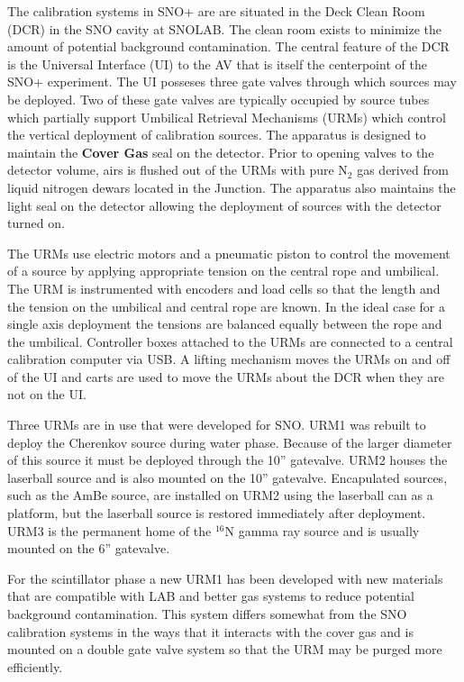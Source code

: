 The calibration systems in SNO+ are are situated in the Deck Clean
Room (DCR) in the SNO cavity at SNOLAB. The clean room exists to
minimize the amount of potential background contamination. The central
feature of the DCR is the Universal Interface (UI) to the AV that is
itself the centerpoint of the SNO+ experiment. The UI posseses three
gate valves through which sources may be deployed. Two of these gate
valves are typically occupied by source tubes which partially support
Umbilical Retrieval Mechanisms (URMs) which control the vertical
deployment of calibration sources. The apparatus is designed to
maintain the \textbf{Cover Gas} seal on the detector. Prior to opening
valves to the detector volume, airs is flushed out of the URMs with
pure N$_{2}$ gas derived from liquid nitrogen dewars located in the
Junction. The apparatus also maintains the light seal on the detector
allowing the deployment of sources with the detector turned on.

The URMs use electric motors and a pneumatic
piston to control the movement of a source by applying appropriate
tension on the central rope and umbilical. The URM is instrumented
with encoders and load cells so that the length and the tension on the
umbilical and central rope are known. In the ideal case for a single
axis deployment the tensions are balanced equally between the rope and
the umbilical. Controller boxes attached to the URMs are connected to
a central calibration computer via USB. A lifting mechanism moves the
URMs on and off of the UI and carts are used to move the URMs about
the DCR when they are not on the UI.

Three URMs are in use that were developed for SNO. URM1 was rebuilt to
deploy the Cherenkov source during water phase. Because of the larger
diameter of this source it must be deployed through the 10''
gatevalve. URM2 houses the laserball source and is also mounted on the
10'' gatevalve. Encapulated sources, such as the AmBe source, are
installed on URM2 using the laserball can as a platform, but the
laserball source is restored immediately after deployment. URM3 is the
permanent home of the $^{16}$N gamma ray source and is usually mounted
on the 6'' gatevalve.

For the scintillator phase a new URM1 has been developed with new
materials that are compatible with LAB and better gas systems to
reduce potential background contamination. This system differs
somewhat from the SNO calibration systems in the ways that it
interacts with the cover gas and is mounted on a double gate valve
system so that the URM may be purged more efficiently.

